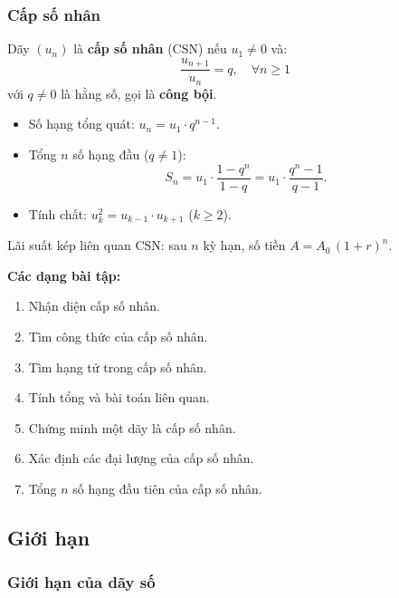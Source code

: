\documentclass[12pt,a4paper]{article}
\begin{document}
\subsubsection{Cấp số nhân}

\begin{dinhnghia}
  Dãy $(u_n)$ là \textbf{cấp số nhân} (CSN) nếu $u_1 \ne 0$ và:
  \[
    \frac{u_{n+1}}{u_n} = q,\quad \forall n \ge 1
  \]
  với $q \ne 0$ là hằng số, gọi là \textbf{công bội}.
\end{dinhnghia}

\begin{congthuc}
  \begin{itemize}
    \item Số hạng tổng quát: $u_n = u_1 \cdot q^{n-1}$.
    \item Tổng $n$ số hạng đầu ($q \ne 1$):
      \[
        S_n = u_1 \cdot \frac{1 - q^n}{1 - q} = u_1 \cdot \frac{q^n - 1}{q - 1}.
      \]
    \item Tính chất: $u_k^2 = u_{k-1} \cdot u_{k+1}$ \;($k \ge 2$).
  \end{itemize}
\end{congthuc}

\begin{luuy}
  Lãi suất kép liên quan CSN: sau $n$ kỳ hạn, số tiền $A = A_0\,(1 + r)^n$.
\end{luuy}

\medskip\noindent\textbf{Các dạng bài tập:}
\begin{enumerate}[label=\textbf{Dạng \arabic*:}, leftmargin=*, align=left]
  \item Nhận diện cấp số nhân.
  \item Tìm công thức của cấp số nhân.
  \item Tìm hạng tử trong cấp số nhân.
  \item Tính tổng và bài toán liên quan.
  \item Chứng minh một dãy là cấp số nhân.
  \item Xác định các đại lượng của cấp số nhân.
  \item Tổng $n$ số hạng đầu tiên của cấp số nhân.
\end{enumerate}

\subsection{Giới hạn}

\subsubsection{Giới hạn của dãy số}
\end{document}
